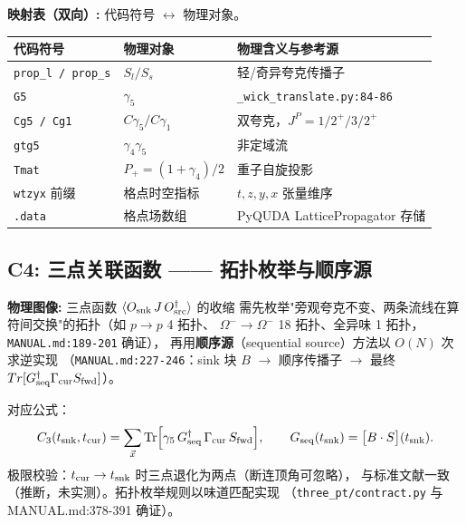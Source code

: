 \documentclass[UTF8]{ctexart}
\begin{document}
\begin{mapbox}
\textbf{映射表（双向）:} 代码符号 $\leftrightarrow$ 物理对象。
\end{mapbox}
\begin{xltabular}{\textwidth}{llX}
\toprule
\textcolor{map}{代码符号} & 物理对象 & 物理含义与参考源 \\
\midrule
\endhead
\texttt{prop\_l / prop\_s} & $S_l / S_s$ & 轻/奇异夸克传播子 \\
\texttt{G5} & $\gamma_5$ & \nolinkurl{_wick_translate.py:84-86} \\
\texttt{Cg5 / Cg1} & $C\gamma_5/C\gamma_1$ & 双夸克，$J^P=1/2^+/3/2^+$ \\
\texttt{gtg5} & $\gamma_4\gamma_5$ & 非定域流 \\
\texttt{Tmat} & $P_+=(1+\gamma_4)/2$ & 重子自旋投影 \\
\texttt{wtzyx} 前缀 & 格点时空指标 & $t,z,y,x$ 张量维序 \\
\texttt{.data} & 格点场数组 & PyQUDA LatticePropagator 存储 \\
\bottomrule
\end{xltabular}

\subsection{C4: 三点关联函数 —— 拓扑枚举与顺序源}
\begin{physbox}
\textbf{物理图像:} 三点函数 $\langle O_{\rm snk}\,J\,O_{\rm src}^\dagger\rangle$ 的收缩
需先枚举"旁观夸克不变、两条流线在算符间交换"的拓扑（如 $p\to p$ 4 拓扑、
$\Omega^-\to\Omega^-$ 18 拓扑、全异味 1 拓扑，\nolinkurl{MANUAL.md:189-201} 确证），
再用\textbf{顺序源}（sequential source）方法以 $O(N)$ 次求逆实现
（\nolinkurl{MANUAL.md:227-246}：sink 块 $B$ $\to$ 顺序传播子
$\to$ 最终 $Tr[G_{\rm seq}^\dagger \Gamma_{\rm cur} S_{\rm fwd}]$）。
\end{physbox}
\textcolor{phys}{对应公式}：
\begin{equation}\label{eq:3pt}
C_3(t_{\rm snk},t_{\rm cur})=\sum_{\vec x}\operatorname{Tr}\!\Big[
\gamma_5\,G_{\rm seq}^\dagger\,\Gamma_{\rm cur}\,S_{\rm fwd}\Big],
\qquad G_{\rm seq}(t_{\rm snk})=\big[B\cdot S\big](t_{\rm snk}).
\end{equation}
\textcolor{phys}{极限校验}：$t_{\rm cur}\to t_{\rm snk}$ 时三点退化为两点（断连顶角可忽略），
与标准文献一致（推断，未实测）。拓扑枚举规则以味道匹配实现
（\nolinkurl{three_pt/contract.py} 与 MANUAL.md:378-391 确证）。
\end{document}
